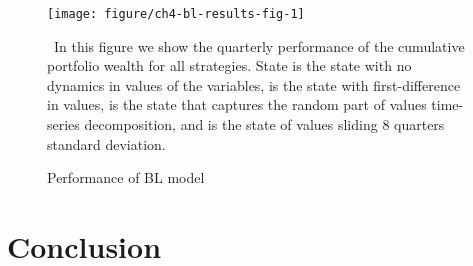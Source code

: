 \documentclass[a4paper,twoside,12pt,openright,notitlepage]{report}\usepackage[]{graphicx}\usepackage[]{color}
\makeatletter
\def\maxwidth{ %
  \ifdim\Gin@nat@width>\linewidth
    \linewidth
  \else
    \Gin@nat@width
  \fi
}
\newenvironment{knitrout}{}{} %
\makeatother
\begin{document}
\begin{figure}
\begin{knitrout}
\color{fgcolor}
\texttt{[image: figure/ch4-bl-results-fig-1]} 

\end{knitrout}
\caption{Performance of BL model}
\label{ch4-fig:bl-results}
\ In this figure we show the quarterly performance of the cumulative portfolio wealth for all strategies.  State \last{} is the state with no dynamics in values of the variables, \diff{} is the state with first-difference in values, \random{} is the state that captures the random part of values time-series decomposition,  and \rollsd{} is the state of values sliding 8 quarters standard deviation.
\end{figure}
\processdelayedfloats
\cleardoublepage

\chapter{Conclusion}
\label{conclusion}

\cleardoublepage


	\renewcommand{\bibname}{References}					%
	\begin{singlespace}
	\end{singlespace}
	\clearemptydoublepage



\end{document}
